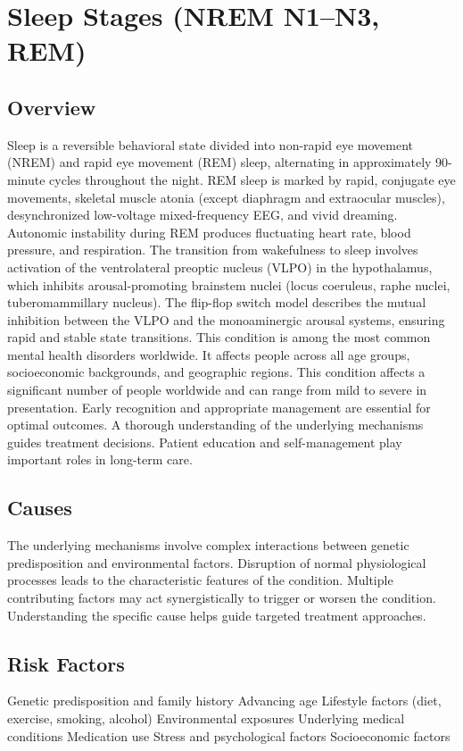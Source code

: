 \chapter{Sleep Stages (NREM N1--N3, REM)}
\label{sec:Sleep Stages}

\section{Overview}
Sleep is a reversible behavioral state divided into non-rapid eye movement (NREM) and rapid eye movement (REM) sleep, alternating in approximately 90-minute cycles throughout the night. REM sleep is marked by rapid, conjugate eye movements, skeletal muscle atonia (except diaphragm and extraocular muscles), desynchronized low-voltage mixed-frequency EEG, and vivid dreaming. Autonomic instability during REM produces fluctuating heart rate, blood pressure, and respiration. The transition from wakefulness to sleep involves activation of the ventrolateral preoptic nucleus (VLPO) in the hypothalamus, which inhibits arousal-promoting brainstem nuclei (locus coeruleus, raphe nuclei, tuberomammillary nucleus). The flip-flop switch model describes the mutual inhibition between the VLPO and the monoaminergic arousal systems, ensuring rapid and stable state transitions. This condition is among the most common mental health disorders worldwide. It affects people across all age groups, socioeconomic backgrounds, and geographic regions. This condition affects a significant number of people worldwide and can range from mild to severe in presentation. Early recognition and appropriate management are essential for optimal outcomes. A thorough understanding of the underlying mechanisms guides treatment decisions. Patient education and self-management play important roles in long-term care.
\section{Causes}
The underlying mechanisms involve complex interactions between genetic predisposition and environmental factors. Disruption of normal physiological processes leads to the characteristic features of the condition. Multiple contributing factors may act synergistically to trigger or worsen the condition. Understanding the specific cause helps guide targeted treatment approaches.
\section{Risk Factors}
Genetic predisposition and family history Advancing age Lifestyle factors (diet, exercise, smoking, alcohol) Environmental exposures Underlying medical conditions Medication use Stress and psychological factors Socioeconomic factors

